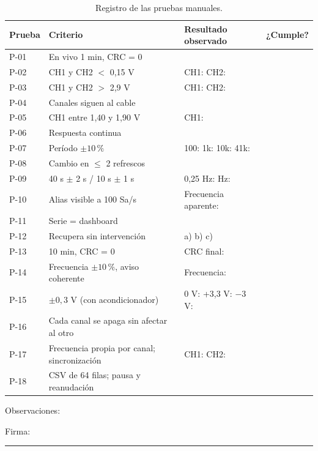 \documentclass[12pt,a4paper]{article}
\begin{document}
\begin{table}[H]
\centering
\small
\begin{tabular}{@{}p{1.2cm} p{4.4cm} p{5.6cm} p{1.4cm}@{}}
\toprule
\textbf{Prueba} & \textbf{Criterio} & \textbf{Resultado observado} & \textbf{¿Cumple?} \\
\midrule
P-01 & En vivo 1 min, CRC = 0 & & \\[0.5cm]
P-02 & CH1 y CH2 $<$ 0{,}15 V & CH1: \qquad CH2: & \\[0.5cm]
P-03 & CH1 y CH2 $>$ 2{,}9 V & CH1: \qquad CH2: & \\[0.5cm]
P-04 & Canales siguen al cable & & \\[0.5cm]
P-05 & CH1 entre 1{,}40 y 1{,}90 V & CH1: & \\[0.5cm]
P-06 & Respuesta continua & & \\[0.5cm]
P-07 & Período $\pm 10\,\%$ & 100: \quad 1k: \quad 10k: \quad 41k: & \\[0.5cm]
P-08 & Cambio en $\leq$ 2 refrescos & & \\[0.5cm]
P-09 & 40 s $\pm$ 2 s / 10 s $\pm$ 1 s & 0{,}25 Hz: \quad 1 Hz: & \\[0.5cm]
P-10 & Alias visible a 100 Sa/s & Frecuencia aparente: & \\[0.5cm]
P-11 & Serie = dashboard & & \\[0.5cm]
P-12 & Recupera sin intervención & a) \quad b) \quad c) & \\[0.5cm]
P-13 & 10 min, CRC = 0 & CRC final: & \\[0.5cm]
P-14 & Frecuencia $\pm 10\,\%$, aviso coherente & Frecuencia: & \\[0.5cm]
P-15 & $\pm 0{,}3$ V (con acondicionador) & 0 V: \quad +3,3 V: \quad $-3$ V: & \\[0.5cm]
P-16 & Cada canal se apaga sin afectar al otro & & \\[0.5cm]
P-17 & Frecuencia propia por canal; sincronización & CH1: \quad CH2: & \\[0.5cm]
P-18 & CSV de 64 filas; pausa y reanudación & & \\[0.5cm]
\bottomrule
\end{tabular}
\caption{Registro de las pruebas manuales.}
\end{table}

\noindent Observaciones: \hrulefill

\vspace{0.6cm}
\noindent\hrulefill

\vspace{1.2cm}
\noindent Firma: \rule{6cm}{0.4pt}
\end{document}
